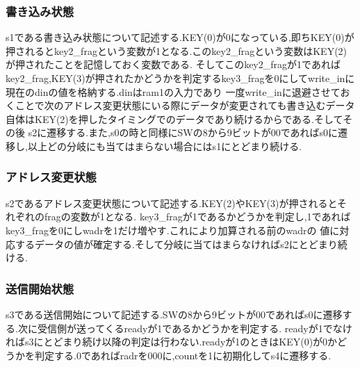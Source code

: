 \documentclass[dvipdfmx]{jarticle}
\begin{document}
\subsubsection{書き込み状態}
s1である書き込み状態について記述する.KEY(0)が0になっている,即ちKEY(0)が押されるとkey2\_fragという変数が1となる.このkey2\_fragという変数はKEY(2)が押されたことを記憶しておく変数である.
そしてこのkey2\_fragが1であればkey2\_frag,KEY(3)が押されたかどうかを判定するkey3\_fragを0にしてwrite\_inに現在のdinの値を格納する.dinはram1の入力であり
一度write\_inに退避させておくことで次のアドレス変更状態にいる際にデータが変更されても書き込むデータ自体はKEY(2)を押したタイミングでのデータであり続けるからである.そしてその後
s2に遷移する.また,s0の時と同様にSWの8から9ビットが00であればs0に遷移し,以上どの分岐にも当てはまらない場合にはs1にとどまり続ける.

\subsubsection{アドレス変更状態}
s2であるアドレス変更状態について記述する.KEY(2)やKEY(3)が押されるとそれぞれのfragの変数が1となる.
key3\_fragが1であるかどうかを判定し,1であればkey3\_fragを0にしwadrを1だけ増やす.これにより加算される前のwadrの
値に対応するデータの値が確定する.そして分岐に当てはまらなければs2にとどまり続ける.
\subsubsection{送信開始状態}
s3である送信開始について記述する.SWの8から9ビットが00であればs0に遷移する.次に受信側が送ってくるreadyが1であるかどうかを判定する.
readyが1でなければs3にとどまり続け以降の判定は行わない.readyが1のときはKEY(0)が0かどうかを判定する.0であればradrを000に,countを1に初期化してs4に遷移する.
\end{document}
